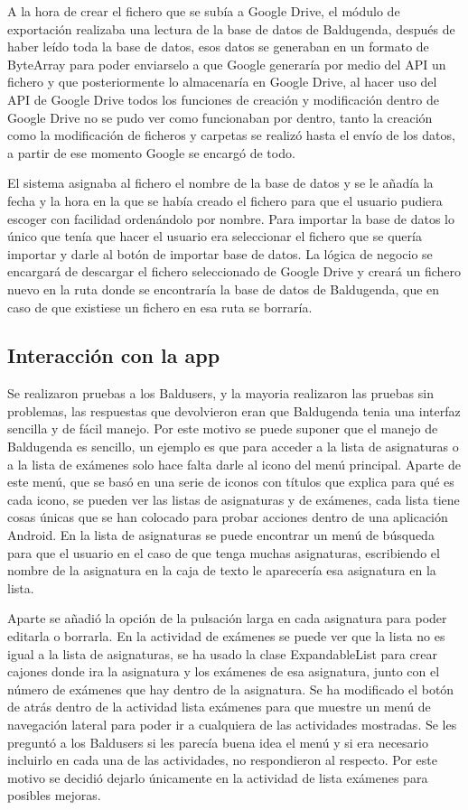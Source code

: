 A la hora de crear el fichero que se subía a Google Drive, el módulo de exportación realizaba una lectura de la base de datos de Baldugenda, después de haber leído toda la base de datos, esos datos se generaban en un formato de ByteArray para poder enviarselo a que Google generaría por medio del API un fichero y que posteriormente lo almacenaría en Google Drive, al hacer uso del API de Google Drive todos los funciones de creación y modificación dentro de Google Drive no se pudo ver como funcionaban por dentro, tanto la creación como la modificación de ficheros y carpetas se realizó hasta el envío de los datos, a partir de ese momento Google se encargó de todo.

El sistema asignaba al fichero el nombre de la base de datos y se le añadía la fecha y la hora en la que se había creado el fichero para que el usuario pudiera escoger con facilidad ordenándolo por nombre.
Para importar la base de datos lo único que tenía que hacer el usuario era seleccionar el fichero que se quería importar y darle al botón de importar base de datos.
La lógica de negocio se encargará de descargar el fichero seleccionado de Google Drive y creará un fichero nuevo en la ruta donde se encontraría la base de datos de Baldugenda, que en caso de que existiese un fichero en esa ruta se borraría.

\subsection{Interacción con la app}
\label{subsecc:Interacción con la app}

Se realizaron pruebas a los Baldusers, y la mayoria realizaron las pruebas sin problemas, las respuestas que devolvieron eran que Baldugenda tenia una interfaz sencilla y de fácil manejo. Por este motivo se puede suponer que el manejo de Baldugenda es sencillo, un ejemplo es que para acceder a la lista de asignaturas o a la lista de exámenes solo hace falta darle al icono del menú principal.
Aparte de este menú, que se basó en una serie de iconos con títulos que explica para qué es cada icono, se pueden ver las listas de asignaturas y de exámenes, cada lista tiene cosas únicas que se han colocado para probar acciones dentro de una aplicación Android.
En la lista de asignaturas se puede encontrar un menú de búsqueda para que el usuario en el caso de que tenga muchas asignaturas, escribiendo el nombre de la asignatura en la caja de texto le aparecería esa asignatura en la lista.

Aparte se añadió la opción de la pulsación larga en cada asignatura para poder editarla o borrarla.
En la actividad de exámenes se puede ver que la lista no es igual a la lista de asignaturas, se ha usado la clase ExpandableList para crear cajones donde ira la asignatura y los exámenes de esa asignatura, junto con el número de exámenes que hay dentro de la asignatura.
Se ha modificado el botón de atrás dentro de la actividad lista exámenes para que muestre un menú de navegación lateral para poder ir a cualquiera de las actividades mostradas. Se les preguntó a los Baldusers si les parecía buena idea el menú y si era necesario incluirlo en cada una de las actividades, no respondieron al respecto. Por este motivo se decidió dejarlo únicamente en la actividad de lista exámenes para posibles mejoras.
